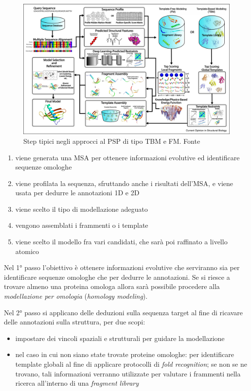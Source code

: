 {\begin{figure}[!htb]
	\centering
	\includegraphics[scale=0.95]{images/FM-TBM.jpg}
	\caption{Step tipici negli approcci al PSP di tipo TBM e FM. Fonte\cite{pearce2021deep}}
	\label{fig:fm-tbm}
\end{figure}

\begin{enumerate}
	\item viene generata una MSA per ottenere informazioni evolutive ed	identificare sequenze omologhe
	\item viene profilata la sequenza, sfruttando anche i risultati dell'MSA, e viene usata per dedurre le annotazioni 1D e 2D
	\item viene scelto il tipo di modellazione adeguato
	\item vengono assemblati i frammenti o i template
	\item viene scelto il modello fra vari candidati, che sarà poi raffinato a livello atomico
\end{enumerate}

\par Nel 1° passo l'obiettivo è ottenere informazioni evolutive che serviranno sia per identificare sequenze omologhe che per dedurre le annotazioni. Se si riesce a trovare almeno una proteina omologa allora sarà possibile procedere alla \textit{modellazione per omologia} (\textit{homology modeling}). \\

\par Nel 2° passo si applicano delle deduzioni sulla sequenza target al fine di ricavare delle annotazioni sulla struttura, per due scopi:
\begin{itemize}
	\item impostare dei vincoli spaziali e strutturali per guidare la modellazione
	\item nel caso in cui non siano state trovate proteine omologhe: per identificare template globali al fine di applicare protocolli di \textit{fold recognition}; se non se ne trovano, tali informazioni verranno utilizzate per valutare i frammenti nella ricerca all'interno di una \textit{fragment library}
\end{itemize}

}
